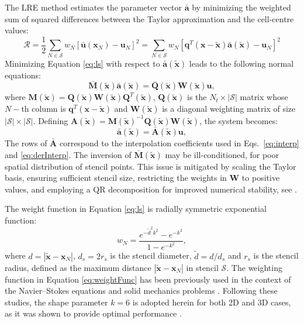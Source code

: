 \documentclass[sn-mathphys,Numbered]{sn-jnl}%
\newcommand{\bb}{\boldsymbol}
\begin{document}
%
The LRE method estimates the parameter vector $\bar{\mathbf{a}}$ by minimizing the weighted sum of squared differences between the Taylor approximation and the cell-centre values:
%
\begin{equation}\label{eq:ls}
\mathcal{R} = \frac{1}{2} \sum_{N \in \mathcal{S}} w_N \left [ \bar{\bb{u}}(\bb{x}_N) - \bb{u}_N\right]^2 = \sum_{N \in \mathcal{S}} w_N \left [ \mathbf{q}^T(\bb{x}-\tilde{\bb{x}})\bar{\mathbf{a}}(\tilde{\bb{x}}) - \bb{u}_N\right]^2
\end{equation}
%
Minimizing Equation \eqref{eq:ls} with respect to $\bar{\mathbf{a}}(\tilde{\boldsymbol{x}})$ leads to the following normal equations:
%
\begin{equation}
\mathbf{\bar{M}}(\tilde{\bb{x}}) \mathbf{\bar{a}}(\tilde{\bb{x}}) = \mathbf{\bar{Q}}(\tilde{\bb{x}}) \mathbf{{W}}(\tilde{\bb{x}}) \mathbf{u},
\end{equation}
%
where $\mathbf{M}(\tilde{\bb{x}})=\mathbf{Q}(\tilde{\bb{x}})\mathbf{W}(\tilde{\bb{x}})\mathbf{Q}^T(\tilde{\bb{x}})$, $\mathbf{Q}(\tilde{\bb{x}})$ is the $N_t \times |\mathcal{S}|$ matrix whose $N-$th column is $\mathbf{q}^T(\bb{x}-\tilde{\bb{x}})$ and $\mathbf{W}(\tilde{\bb{x}})$ is a diagonal weighting matrix of size $|\mathcal{S}| \times |\mathcal{S}|$.
Defining $\mathbf{A}(\tilde{\bb{x}})=\mathbf{M}(\tilde{\bb{x}})^{-1}\mathbf{Q}(\tilde{\bb{x}})\mathbf{W}(\tilde{\bb{x}})$, the system becomes:
\begin{equation}
\mathbf{\bar{a}}(\tilde{\bb{x}}) = \mathbf{\bar{A}}(\tilde{\bb{x}})\mathbf{u}, 
\end{equation}
%
The rows of $\bar{\mathbf{A}}$ correspond to the interpolation coefficients used in 
Eqs.~\eqref{eq:interp} and \eqref{eq:derInterp}.  
The inversion of $\bar{\mathbf{M}}(\tilde{\boldsymbol{x}})$ may be ill-conditioned, for poor spatial distribution of stencil points.  
This issue is mitigated by scaling the Taylor basis, ensuring sufficient stencil size, restricting the weights in $\mathbf{W}$ to positive values, and employing a QR decomposition for improved numerical stability, see \cite{Castrillo2022, Castrillo2023}.
%

%
The weight function in Equation \eqref{eq:ls} is radially symmetric exponential function:
\begin{equation}\label{eq:weightFunc}
w_N = \dfrac{e^{-\tilde{d}^2k^2}-e^{-k^2}}{1-e^{-k^2}},
\end{equation}
where $d=|\bb{\tilde{x}}-\bb{x}_N|$, $d_s=2r_s$ is the stencil diameter, $\tilde{d}=d/d_s$ and $r_s$ is the stencil radius, defined as the maximum distance $|\bb{\tilde{x}}-\bb{x}_N|$ in stencil $\mathcal{S}$. The weighting function in Equation \eqref{eq:weightFunc} has been previously used in the context of the Navier–Stokes equations 
\cite{Khelladi2011, Ramirez2014} and solid mechanics problems \cite{Castrillo2022, Castrillo2023, Castrillo2024}.  
Following these studies, the shape parameter $k = 6$ is adopted herein for both 2D and 3D cases, as it was shown to provide optimal performance \cite{Castrillo2022, Castrillo2023, Castrillo2024}.
%
\end{document}
